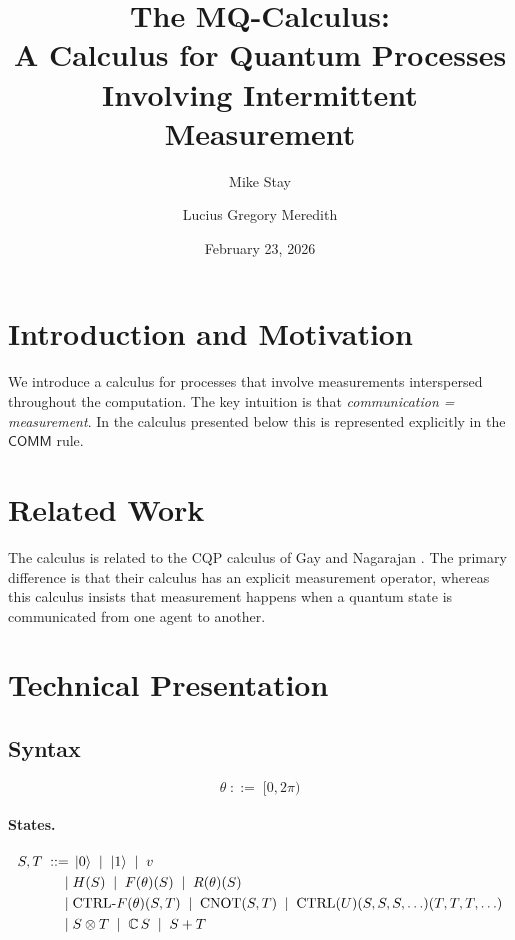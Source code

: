 \documentclass[11pt]{article}
\title{The MQ-Calculus:\\[4pt]
\large A Calculus for Quantum Processes Involving Intermittent Measurement}
\author{Mike Stay \and Lucius Gregory Meredith}
\date{February 23, 2026}
\newcommand{\CTRL}{\mathrm{CTRL}}
\newcommand{\CNOT}{\mathrm{CNOT}}
\begin{document}
\maketitle

\section{Introduction and Motivation}

We introduce a calculus for processes that involve measurements
interspersed throughout the computation.  The key intuition is that
\emph{communication = measurement}. In the calculus presented below
this is represented explicitly in the $\mathsf{COMM}$ rule.

\section{Related Work}

The calculus is related to the CQP calculus of Gay and Nagarajan \cite{DBLP:conf/popl/GayN05}.  The
primary difference is that their calculus has an explicit measurement
operator, whereas this calculus insists that measurement happens when a
quantum state is communicated from one agent to another.

\section{Technical Presentation}

\subsection{Syntax}

\[
  \theta \;::=\; [0, 2\pi)
\]

\paragraph{States.}
\begin{align*}
  S, T \;::=\; & \ket{0} \;\mid\; \ket{1} \;\mid\; v \\
    \mid\; & H(S) \;\mid\; F(\theta)(S) \;\mid\; R(\theta)(S) \\
    \mid\; & \CTRL\text{-}F(\theta)(S, T)
            \;\mid\; \CNOT(S, T)
            \;\mid\; \CTRL(U)(S, S, S, \ldots)(T, T, T, \ldots) \\
    \mid\; & S \otimes T
            \;\mid\; \mathbb{C}\, S
            \;\mid\; S + T
\end{align*}
\end{document}
